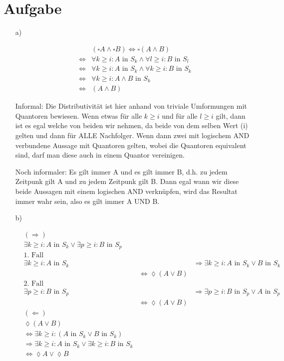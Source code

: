 \section{Aufgabe}

\begin{itemize}
	\item[a)]

	\begin{align}
		& ( \square A \land \square B) \Leftrightarrow \square (A \land B) \\
		\Leftrightarrow & \forall k \geq i: A \text{ in } S_k \land \forall l \geq i: B 
		\text{ in } S_l \\
		\Leftrightarrow & \forall k \geq i: A \text{ in } S_k \land \forall
		k \geq i: B \text{ in } S_k \\
		\Leftrightarrow & \forall k \geq i: A \land B \text{ in } S_k \\
		\Leftrightarrow & (A \land B)
	\end{align}

Informal: Die Distributivität ist hier anhand von triviale Umformungen mit Quantoren bewiesen. Wenn etwas für alle $k \geq i$ und für alle $l \geq i$ gilt, dann ist es egal welche von beiden wir nehmen, da beide von dem selben Wert (i) gelten und dann für ALLE Nachfolger. Wenn dann zwei mit logischem AND verbundene Aussage mit Quantoren gelten, wobei die Quantoren equivalent sind, darf man diese auch in einem Quantor vereinigen.

Noch informaler: Es gilt immer A und es gilt immer B, d.h. zu jedem Zeitpunk gilt A und zu jedem Zeitpunk gilt B. Dann egal wann wir diese beide Aussagen mit einem logischen AND verknüpfen, wird das Resultat immer wahr sein, also es gilt immer A UND B.

\item[b)]

\begin{align}
	& ( \Rightarrow ) \\
	& \exists k \geq i: A \text{ in } S_k \lor \exists p \geq i: B \text{ in } S_p \\
	& \text{1. Fall} \\
	& \exists k \geq i: A \text{ in } S_k && \Rightarrow \exists k \geq i: A \text{ in } S_k \lor B \text{ in } S_k \\
	&& \Leftrightarrow \lozenge (A \lor B) \\
	& \text{2. Fall} \\
	& \exists p \geq i: B \text{ in } S_p && \Rightarrow \exists p \geq i: B \text{ in } S_p \lor A \text{ in } S_p \\
	&& \Leftrightarrow \lozenge (A \lor B) \\
	& ( \Leftarrow ) \\
	& \lozenge (A \lor B) \\
	& \Leftrightarrow \exists k \geq i: (A \text{ in } S_k \lor B \text{ in } S_k) \\
	& \Rightarrow \exists k \geq i: A \text{ in } S_k \lor \exists k \geq i: B \text{ in } S_k \\
	& \Leftrightarrow \lozenge A \lor \lozenge B
\end{align}


\end{itemize}
